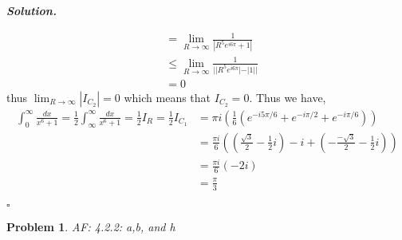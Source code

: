 \documentclass[12pt]{report}
\newtheorem{problem}{Problem}
\newenvironment{solution}[1][\it{Solution}]{\textbf{#1. } }{$\square$}
\begin{document}
\begin{solution}
\begin{enumerate}
\begin{align*}
            &= \lim_{R \rightarrow \infty}\frac{1}{|R^5e^{i6\pi} + 1|}\\
            &\leq \lim_{R \rightarrow \infty}\frac{1}{| |R^5e^{i6\pi}| - |1| |}\\
            &= 0
        \end{align*}
        thus $\lim_{R \rightarrow \infty} |I_{C_2}| = 0$ which means that $I_{C_2} = 0$. Thus we have,
        \begin{align*}
            \int_0^\infty \frac{dx}{x^6 + 1} = \frac{1}{2}\int_{\infty}^\infty \frac{dx}{x^6 + 1} = \frac{1}{2}I_R = \frac{1}{2}I_{C_1} &= \pi i \left( \frac{1}{6} \left( e^{-i5\pi/6} + e^{-i\pi/2} + e^{-i\pi/6}\right) \right)\\
            &= \frac{\pi i}{6} \left( \left( \frac{\sqrt{3}}{2} - \frac{1}{2} i\right) - i + \left( -\frac{-\sqrt{3}}{2} - \frac{1}{2} i\right) \right)\\
            &= \frac{\pi i}{6}(-2i)\\
            &= \frac{\pi}{3}
        \end{align*} 
    \end{enumerate}
\end{solution}

\newpage



\begin{problem}
    AF: 4.2.2: a,b, and h 
\end{problem}
\end{document}
